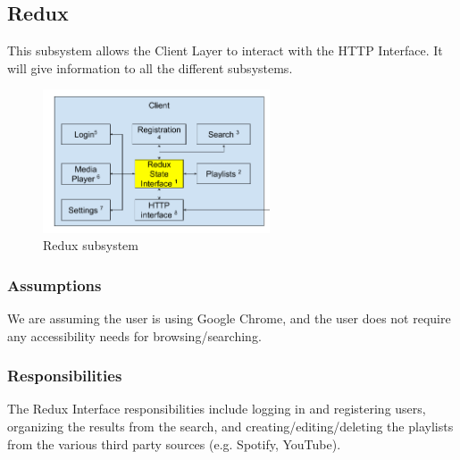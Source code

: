 \subsection{Redux}
This subsystem allows the Client Layer to interact with the HTTP Interface. It will give information to all the different subsystems.

\begin{figure}[h!]
	\centering
 	\includegraphics[width=0.60\textwidth]{images/client/client_redux.png}
 	\caption{Redux subsystem}
\end{figure}

\subsubsection{Assumptions}
We are assuming the user is using Google Chrome, and the user does not require any accessibility needs for browsing/searching.

\subsubsection{Responsibilities}
The Redux Interface responsibilities include logging in and registering users, organizing the results from the search, and creating/editing/deleting the playlists from the various third party sources (e.g. Spotify, YouTube).

